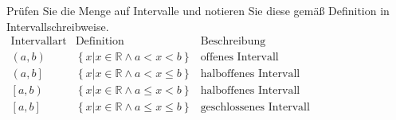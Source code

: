 Prüfen Sie die Menge auf Intervalle und notieren Sie diese gemäß Definition in Intervallschreibweise. \\

$
\begin{array}{c|c|c}
	\text{Intervallart} & \text{Definition} & \text{Beschreibung}\\
	\hline
	\left( a,b\right) & \left\{x \vert x\in \mathbb{R } \land a < x < b\right\} & \text{offenes Intervall} \\
	\left(a,b \right]  & \left\{x \vert x\in \mathbb{R } \land a < x \le b\right\} 	 & \text{halboffenes Intervall} \\
	\left[a,b \right)  & \left\{x \vert x\in \mathbb{R } \land a \le x < b\right\} 	 & \text{halboffenes Intervall} \\	
	\left[a,b \right]  & \left\{x \vert x\in \mathbb{R } \land a \le x \le b\right\} 	 & \text{geschlossenes Intervall} \\	
\end{array}
$